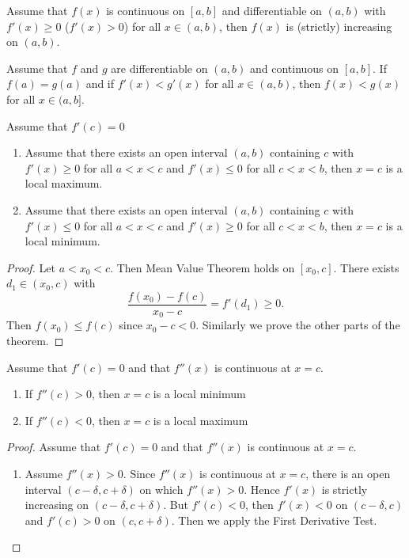 
\begin{thm}
Assume that $f(x)$ is continuous on $[a,b]$ and differentiable on $(a,b)$ with $f'(x) \geq 0$ ($f'(x) > 0$) for all $x\in (a,b)$, then $f(x)$ is (strictly) increasing on $(a,b)$.
\end{thm}


\begin{thm}
Assume that $f$ and $g$ are differentiable on $(a,b)$ and continuous on $[a,b]$. If $f(a) = g(a)$ and if $f'(x)<g'(x)$ for all $x \in (a,b)$, then $f(x) < g(x)$ for all $x \in (a,b]$. 
\end{thm}


\begin{thm}
Assume that $f'(c) = 0$

\begin{enumerate}
\item Assume that there exists an open interval $(a,b)$ containing $c$ with $f'(x) \geq 0$ for all $a<x<c$ and $f'(x) \leq 0$ for all $c<x<b$, then $x=c$ is a local maximum.

\item Assume that there exists an open interval $(a,b)$ containing $c$ with $f'(x) \leq 0$ for all $a<x<c$ and $f'(x) \geq 0$ for all $c<x<b$, then $x=c$ is a local minimum.
\end{enumerate}
\end{thm}

\begin{proof}
Let $a < x_0 < c$. Then Mean Value Theorem holds on $[x_0,c]$. There exists $d_1 \in (x_0 ,c)$ with \[\frac{f(x_0) - f(c)}{x_0 - c} = f'(d_1) \geq 0.\] Then $f(x_0) \leq f(c)$ since $x_0 - c < 0$. Similarly we prove the other parts of the theorem.
\end{proof}

\begin{thm}
Assume that $f'(c) = 0$ and that $f''(x)$ is continuous at $x=c$.
\begin{enumerate}
\item If $f''(c) > 0$, then $x = c$ is a local minimum
\item If $f''(c) < 0$, then $x= c$ is a local maximum
\end{enumerate}
\end{thm}

\begin{proof}
Assume that $f'(c) = 0$ and that $f''(x)$ is continuous at $x=c$.
\begin{enumerate}
\item Assume $f''(x) > 0$. Since $f''(x)$ is continuous at $x=c$, there is an open interval $(c-\delta, c+\delta)$ on which $f''(x) > 0$. Hence $f'(x)$ is strictly increasing on $(c-\delta,c+\delta)$. But $f'(c) <0$, then $f'(x) < 0$ on $(c-\delta , c)$ and $f'(c) > 0$ on $(c,c+\delta)$. Then we apply the First Derivative Test.
\end{enumerate}
\end{proof}

